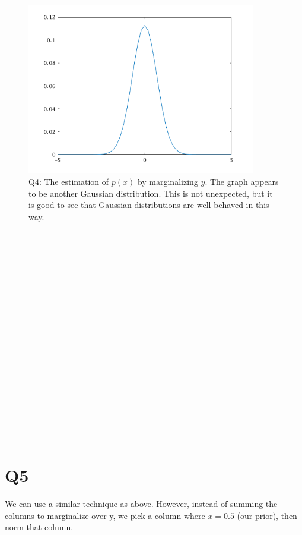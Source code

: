 \documentclass{article}
\begin{document}
\begin{figure}[!ht]
	\centering
	\includegraphics[width=100mm]{marginalized-gaussian.png}
	\caption{Q4: The estimation of $ p(x) $ by marginalizing $ y $. The graph 
appears to be another Gaussian distribution. This is not unexpected, but it is 
good to see that Gaussian distributions are well-behaved in this way.}
\end{figure}

~\\
~\\
~\\
~\\
~\\
~\\
~\\
~\\
~\\
~\\
~\\
~\\
~\\
~\\
~\\
~\\
~\\
~\\

\section{Q5}

We can use a similar technique as above. However, instead of summing the 
columns to marginalize over y, we pick a column where $ x = 0.5 $ (our prior), 
then norm that column.
\end{document}
